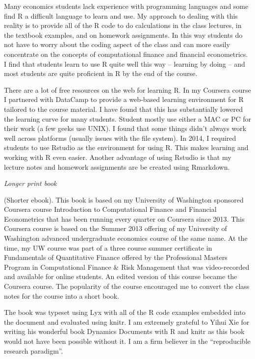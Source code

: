 \documentclass[
  letterpaper,
  DIV=11,
  numbers=noendperiod]{scrreprt}
\theoremstyle{definition}
\theoremstyle{definition}
\theoremstyle{remark}
\begin{document}
Many economics students lack experience with programming languages and
some find R a difficult language to learn and use. My approach to
dealing with this reality is to provide all of the R code to do
calculations in the class lectures, in the textbook examples, and on
homework assignments. In this way students do not have to worry about
the coding aspect of the class and can more easily concentrate on the
concepts of computational finance and financial econometrics. I find
that students learn to use R quite well this way -- learning by doing --
and most students are quite proficient in R by the end of the course.

There are a lot of free resources on the web for learning R. In my
Coursera course I partnered with DataCamp to provide a web-based
learning environment for R tailored to the course material. I have found
that this has substantially lowered the learning curve for many
students. Student mostly use either a MAC or PC for their work (a few
geeks use UNIX). I found that some things didn't always work well across
platforms (usually issues with the file system). In 2014, I required
students to use Rstudio as the environment for using R. This makes
learning and working with R even easier. Another advantage of using
Rstudio is that my lecture notes and homework assignments are be created
using Rmarkdown.

\emph{Longer print book}

(Shorter ebook). This book is based on my University of Washington
sponsored Coursera course Introduction to Computational Finance and
Financial Econometrics that has been running every quarter on Coursera
since 2013. This Coursera course is based on the Summer 2013 offering of
my University of Washington advanced undergraduate economics course of
the same name. At the time, my UW course was part of a three course
summer certificate in Fundamentals of Quantitative Finance offered by
the Professional Masters Program in Computational Finance \& Risk
Management that was video-recorded and available for online students. An
edited version of this course became the Coursera course. The popularity
of the course encouraged me to convert the class notes for the course
into a short book.

The book was typeset using Lyx with all of the R code examples embedded
into the document and evaluated using knitr. I am extremely grateful to
Yihui Xie for writing his wonderful book Dynamics Documents with R and
knitr as this book would not have been possible without it. I am a firm
believer in the ``reproducible research paradigm''.
\end{document}
